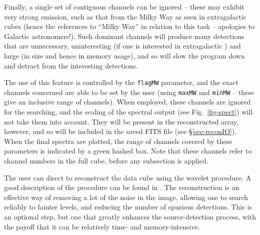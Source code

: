 \label{sec-MW}

Finally, a single set of contiguous channels can be ignored -- these
may exhibit very strong emission, such as that from the Milky Way as
seen in extragalactic \hi cubes (hence the references to ``Milky
Way'' in relation to this task -- apologies to Galactic
astronomers!). Such dominant channels will produce many detections
that are unnecessary, uninteresting (if one is interested in
extragalactic \hi) and large (in size and hence in memory usage), and
so will slow the program down and detract from the interesting
detections. 

The use of this feature is controlled by the \texttt{flagMW}
parameter, and the exact channels concerned are able to be set by the
user (using \texttt{maxMW} and \texttt{minMW} -- these give an
inclusive range of channels). When employed, these channels are
ignored for the searching, and the scaling of the spectral output (see
Fig.~\ref{fig-spect}) will not take them into account. They will be
present in the reconstructed array, however, and so will be included
in the saved FITS file (see \S\ref{sec-reconIO}). When the final
spectra are plotted, the range of channels covered by these parameters
is indicated by a green hashed box. Note that these channels refer to
channel numbers in the full cube, before any subsection is applied.

\label{sec-recon}

The user can direct \duchamp to reconstruct the data cube using the
\atrous wavelet procedure. A good description of the procedure can be
found in \citet{starck02:book}. The reconstruction is an effective way
of removing a lot of the noise in the image, allowing one to search
reliably to fainter levels, and reducing the number of spurious
detections. This is an optional step, but one that greatly enhances
the source-detection process, with the payoff that it can be
relatively time- and memory-intensive.



